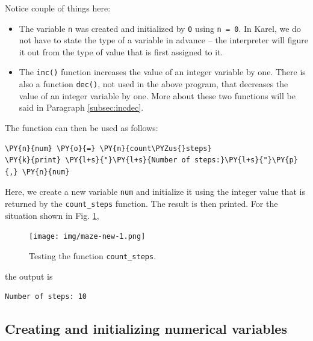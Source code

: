 \noindent
Notice couple of things here:
\begin{itemize}
\item The variable {\tt n} was created and initialized by {\tt 0} using {\tt n = 0}. In
      Karel, we do not have to state the type of a variable in advance -- the interpreter 
      will figure it out from the type of value that is first assigned to it.  
\item The {\tt inc()} function increases the value of an integer variable by one. 
      There is also a function {\tt dec()}, not used in the above program, that decreases 
      the value of an integer variable by one. More about these two functions will be said 
      in Paragraph \ref{subsec:incdec}.
\end{itemize}
The function can then be used as follows:\\

\begin{bbox}
\begin{Verbatim}[commandchars=\\\{\}]
\PY{n}{num} \PY{o}{=} \PY{n}{count\PYZus{}steps}
\PY{k}{print} \PY{l+s}{"}\PY{l+s}{Number of steps:}\PY{l+s}{"}\PY{p}{,} \PY{n}{num} 
\end{Verbatim}
\end{bbox}
\vspace{6mm}

\noindent
Here, we create a new variable {\tt num} and initialize it using the 
integer value that is returned by the {\tt count\_steps} function.
The result is then printed. For the situation shown in Fig. \ref{fig:cf-1},
\newpage

\begin{figure}[!ht]
\begin{center}
\texttt{[image: img/maze-new-1.png]}
\vspace{-0mm}
\caption{Testing the function {\tt count\_steps}.}
\vspace{-1cm}
\label{fig:cf-1}
\end{center}
\end{figure}

\noindent
the output is\\

\begin{ybox}
\begin{verbatim}
Number of steps: 10
\end{verbatim}
\end{ybox}
\vspace{6mm}
\subsection[\ \ Creating and initializing numerical variables]{Creating and initializing numerical variables} \label{par:var}

